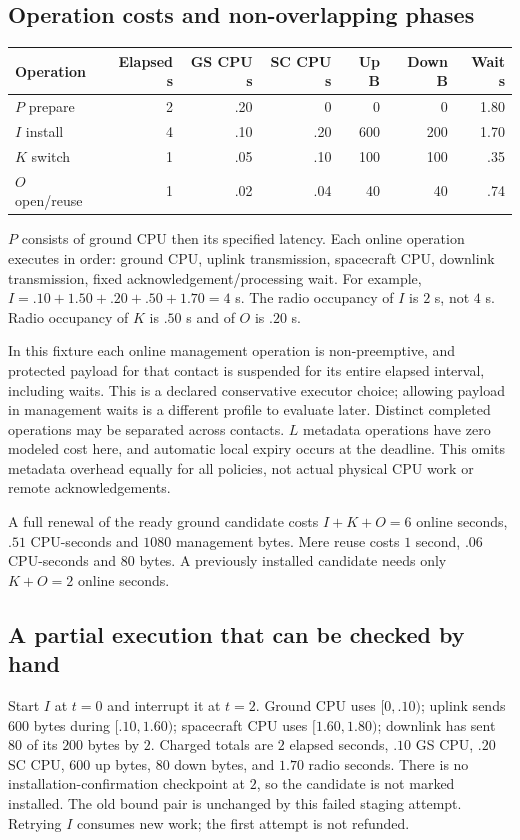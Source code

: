 \documentclass[11pt,a4paper]{article}
\begin{document}
\subsection{Operation costs and non-overlapping phases}
\begin{center}
\begin{tabular}{@{}lrrrrrr@{}}
\toprule
Operation & Elapsed s & GS CPU s & SC CPU s & Up B & Down B & Wait s\\
\midrule
$P$ prepare & 2 & .20 & 0 & 0 & 0 & 1.80\\
$I$ install & 4 & .10 & .20 & 600 & 200 & 1.70\\
$K$ switch & 1 & .05 & .10 & 100 & 100 & .35\\
$O$ open/reuse & 1 & .02 & .04 & 40 & 40 & .74\\
\bottomrule
\end{tabular}
\end{center}
$P$ consists of ground CPU then its specified latency. Each online operation executes in order: ground CPU, uplink transmission, spacecraft CPU, downlink transmission, fixed acknowledgement/processing wait. For example,
$I=.10+1.50+.20+.50+1.70=4$ s.
The radio occupancy of $I$ is $2$ s, not $4$ s. Radio occupancy of $K$ is $.50$ s and of $O$ is $.20$ s.

In this fixture each online management operation is non-preemptive, and protected payload for that contact is suspended for its entire elapsed interval, including waits. This is a declared conservative executor choice; allowing payload in management waits is a different profile to evaluate later. Distinct completed operations may be separated across contacts. $L$ metadata operations have zero modeled cost here, and automatic local expiry occurs at the deadline. This omits metadata overhead equally for all policies, not actual physical CPU work or remote acknowledgements.

A full renewal of the ready ground candidate costs $I+K+O=6$ online seconds, $.51$ CPU-seconds and $1080$ management bytes. Mere reuse costs $1$ second, $.06$ CPU-seconds and $80$ bytes. A previously installed candidate needs only $K+O=2$ online seconds.

\subsection{A partial execution that can be checked by hand}
Start $I$ at $t=0$ and interrupt it at $t=2$. Ground CPU uses $[0,.10)$; uplink sends $600$ bytes during $[.10,1.60)$; spacecraft CPU uses $[1.60,1.80)$; downlink has sent $80$ of its $200$ bytes by $2$. Charged totals are $2$ elapsed seconds, $.10$ GS CPU, $.20$ SC CPU, $600$ up bytes, $80$ down bytes, and $1.70$ radio seconds. There is no installation-confirmation checkpoint at $2$, so the candidate is not marked installed. The old bound pair is unchanged by this failed staging attempt. Retrying $I$ consumes new work; the first attempt is not refunded.
\end{document}
